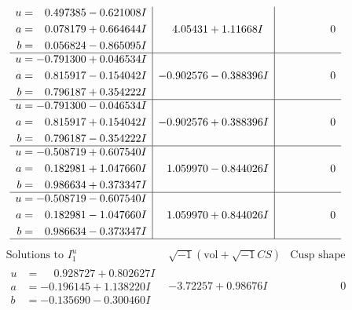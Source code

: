 \documentclass[1p]{elsarticle_modified}
\theoremstyle{definition}
\newcommand{\I}{\sqrt{-1}}
\begin{document}
$$\begin{array}{c|c|c}
\begin{aligned}
u &= \phantom{-}0.497385 - 0.621008 I \\
a &= \phantom{-}0.078179 + 0.664644 I \\
b &= \phantom{-}0.056824 - 0.865095 I\end{aligned}
 & \phantom{-}4.05431 + 1.11668 I & \phantom{-0.000000 } 0 \\ \hline\begin{aligned}
u &= -0.791300 + 0.046534 I \\
a &= \phantom{-}0.815917 - 0.154042 I \\
b &= \phantom{-}0.796187 + 0.354222 I\end{aligned}
 & -0.902576 - 0.388396 I & \phantom{-0.000000 } 0 \\ \hline\begin{aligned}
u &= -0.791300 - 0.046534 I \\
a &= \phantom{-}0.815917 + 0.154042 I \\
b &= \phantom{-}0.796187 - 0.354222 I\end{aligned}
 & -0.902576 + 0.388396 I & \phantom{-0.000000 } 0 \\ \hline\begin{aligned}
u &= -0.508719 + 0.607540 I \\
a &= \phantom{-}0.182981 + 1.047660 I \\
b &= \phantom{-}0.986634 + 0.373347 I\end{aligned}
 & \phantom{-}1.059970 - 0.844026 I & \phantom{-0.000000 } 0 \\ \hline\begin{aligned}
u &= -0.508719 - 0.607540 I \\
a &= \phantom{-}0.182981 - 1.047660 I \\
b &= \phantom{-}0.986634 - 0.373347 I\end{aligned}
 & \phantom{-}1.059970 + 0.844026 I & \phantom{-0.000000 } 0\\
 \hline 
 \end{array}$$\newpage$$\begin{array}{c|c|c}  
\text{Solutions to }I^u_{1}& \I (\text{vol} + \sqrt{-1}CS) & \text{Cusp shape}\\
 \hline 
\begin{aligned}
u &= \phantom{-}0.928727 + 0.802627 I \\
a &= -0.196145 + 1.138220 I \\
b &= -0.135690 - 0.300460 I\end{aligned}
 & -3.72257 + 0.98676 I & \phantom{-0.000000 } 0 \\ \hline\begin{aligned}

\end{aligned}
\end{array}$$
\end{document}
